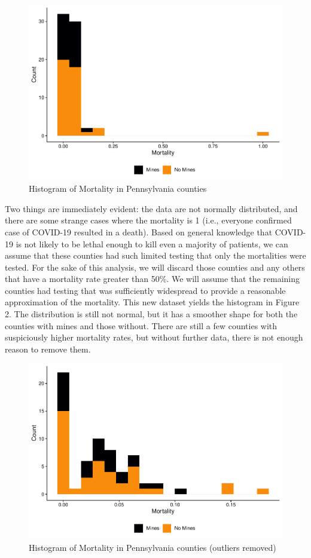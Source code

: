 \documentclass[
  12pt,
]{article}
\begin{document}
\begin{figure}
\centering
\includegraphics{Hancock_ENV872_Project_files/figure-latex/PA Histogram1-1.pdf}
\caption{Histogram of Mortality in Pennsylvania counties}
\end{figure}

Two things are immediately evident: the data are not normally
distributed, and there are some strange cases where the mortality is 1
(i.e., everyone confirmed case of COVID-19 resulted in a death). Based
on general knowledge that COVID-19 is not likely to be lethal enough to
kill even a majority of patients, we can assume that these counties had
such limited testing that only the mortalities were tested. For the sake
of this analysis, we will discard those counties and any others that
have a mortality rate greater than 50\%. We will assume that the
remaining counties had testing that was sufficiently widespread to
provide a reasonable approximation of the mortality. This new dataset
yields the histogram in Figure 2. The distribution is still not normal,
but it has a smoother shape for both the counties with mines and those
without. There are still a few counties with suspiciously higher
mortality rates, but without further data, there is not enough reason to
remove them.

\begin{figure}
\centering
\includegraphics{Hancock_ENV872_Project_files/figure-latex/PA Histogram2-1.pdf}
\caption{Histogram of Mortality in Pennsylvania counties (outliers
removed)}
\end{figure}
\end{document}
